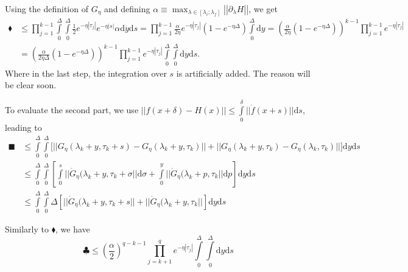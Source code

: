 \documentclass{article}
\renewcommand{\d}{\mathrm{d}}
\begin{document}
Using the definition of $G_\eta$ and defining $\alpha\equiv \max_{\lambda\in{[\lambda_i;\lambda_f]}}\left|\left| \partial_\lambda H \right|\right|$, we get
\begin{equation}
\begin{split}
    \blacklozenge &\leq \prod_{j=1}^{k-1}\int\limits_0^\Delta\int\limits_0^\Delta \frac{1}{2} e^{-\eta|\tau_j|}e^{-\eta|s|}\alpha \d y\d s = \prod_{j=1}^{k-1} \frac{\alpha}{2\eta} e^{-\eta|\tau_j|}(1-e^{-\eta \Delta})\int\limits_0^\Delta\d y = \left(\frac{\alpha}{2\eta}(1-e^{-\eta \Delta})  \right)^{k-1}\prod_{j=1}^{k-1} e^{-\eta|\tau_j|} \\
    &= \left(\frac{\alpha}{2\eta\Delta}(1-e^{-\eta \Delta})  \right)^{k-1}\prod_{j=1}^{k-1} e^{-\eta|\tau_j|} \int\limits_0^\Delta\int\limits_0^\Delta \d y\d s.
\end{split}
\end{equation}
Where in the last step, the integration over $s$ is artificially added. The reason will be clear soon.

To evaluate the second part, we use $||f(x+\delta)-H(x)||\leq \int\limits_0^\delta ||\dot f(x+s)||\d s$, leading to
\begin{equation}
\begin{split}
    \blacksquare & \leq \int\limits_0^\Delta \int\limits_0^\Delta
    \Big[
    ||G_\eta(\lambda_k+y,\tau_k+s)-G_\eta(\lambda_k+y,\tau_k)||+||G_\eta(\lambda_k+y,\tau_k)-G_\eta(\lambda_k,\tau_k)||
    \Big] \d y \d s\\
    &\leq \int\limits_0^\Delta \int\limits_0^\Delta
    \left[
        \int\limits_0^s ||\dot G_\eta(\lambda_k+y,\tau_k+\sigma||\d \sigma +\int\limits_0^y ||\dot G_\eta(\lambda_k+p,\tau_k ||\d p
    \right] \d y \d s\\
    &\leq \int\limits_0^\Delta \int\limits_0^\Delta  \Delta
    \left[ 
        ||\dot G_\eta(\lambda_k+y,\tau_k+s|| + ||\dot G_\eta(\lambda_k+y,\tau_k||
    \right]\d y \d s
\end{split}
\end{equation}

Similarly to $\blacklozenge$, we have
\begin{equation}
    \clubsuit \leq \left(\frac{\alpha}{2} \right)^{q-k-1}\prod_{j=k+1}^q e^{-\eta|\tau_j|}\int\limits_0^\Delta\int\limits_0^\Delta  \d y \d s 
\end{equation}
\end{document}
